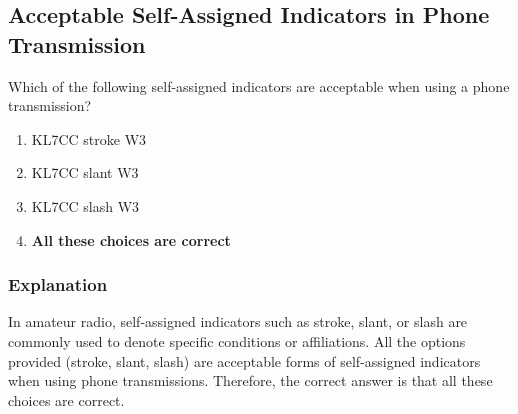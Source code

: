 \subsection{Acceptable Self-Assigned Indicators in Phone Transmission}
\label{T1F06}

\begin{tcolorbox}[colback=gray!10!white,colframe=black!75!black,title=T1F06]
Which of the following self-assigned indicators are acceptable when using a phone transmission?
\begin{enumerate}[label=\Alph*),noitemsep]
    \item KL7CC stroke W3
    \item KL7CC slant W3
    \item KL7CC slash W3
    \item \textbf{All these choices are correct}
\end{enumerate}
\end{tcolorbox}

\subsubsection*{Explanation}
In amateur radio, self-assigned indicators such as stroke, slant, or slash are commonly used to denote specific conditions or affiliations. All the options provided (stroke, slant, slash) are acceptable forms of self-assigned indicators when using phone transmissions. Therefore, the correct answer is that all these choices are correct.